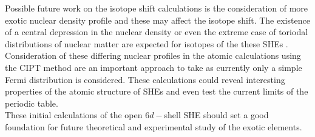 \documentclass[10pt,a4paper, twoside, openright]{report}
\begin{document}
\linebreak
Possible future work on the isotope shift calculations is the consideration of more exotic nuclear density profile and these may affect the isotope shift. The existence of a central depression in the nuclear density or even the extreme case of toriodal distributions of nuclear matter are expected for isotopes of the these SHEs \cite{FD2019}. Consideration of these differing nuclear profiles in the atomic calculations using the CIPT method are an important approach to take as currently only a simple Fermi distribution is considered. These calculations could reveal interesting properties of the atomic structure of SHEs and even test the current limits of the periodic table.\\
\linebreak
These initial calculations of the open $6d-$shell SHE should set a good foundation for future theoretical and experimental study of the exotic elements. 
\appendix
\end{document}
